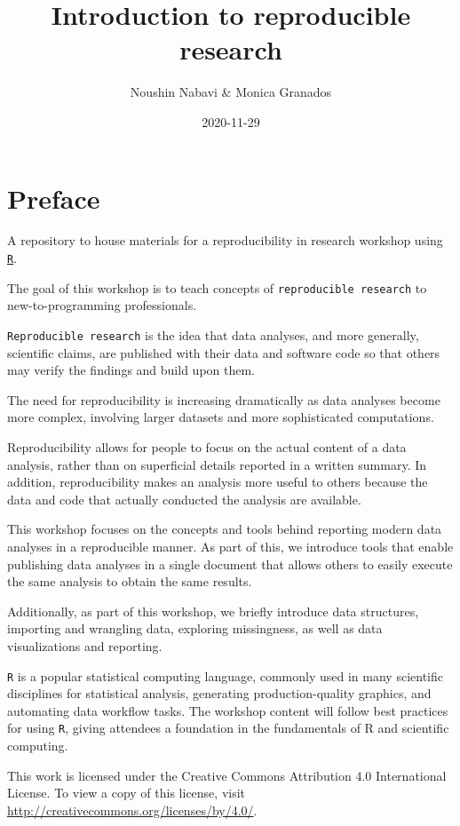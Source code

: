 \documentclass[]{book}
\title{Introduction to reproducible research}
\author{Noushin Nabavi \& Monica Granados}
\date{2020-11-29}
\begin{document}
\maketitle

{
\setcounter{tocdepth}{1}
\tableofcontents
}
\hypertarget{preface}{%
\chapter{Preface}\label{preface}}

A repository to house materials for a reproducibility in research workshop using \href{https://www.r-project.org/}{\texttt{R}}.

The goal of this workshop is to teach concepts of \texttt{reproducible\ research} to new-to-programming professionals.

\texttt{Reproducible\ research} is the idea that data analyses, and more generally, scientific claims, are published with their data and software code so that others may verify the findings and build upon them.

The need for reproducibility is increasing dramatically as data analyses become more complex, involving larger datasets and more sophisticated computations.

Reproducibility allows for people to focus on the actual content of a data analysis, rather than on superficial details reported in a written summary. In addition, reproducibility makes an analysis more useful to others because the data and code that actually conducted the analysis are available.

This workshop focuses on the concepts and tools behind reporting modern data analyses in a reproducible manner. As part of this, we introduce tools that enable publishing data analyses in a single document that allows others to easily execute the same analysis to obtain the same results.

Additionally, as part of this workshop, we briefly introduce data structures, importing and wrangling data, exploring missingness, as well as data visualizations and reporting.

\texttt{R} is a popular statistical computing language, commonly used in many scientific disciplines for statistical analysis, generating production-quality graphics, and automating data workflow tasks. The workshop content will follow best practices for using \texttt{R}, giving attendees a foundation in the fundamentals of R and scientific computing.

This work is licensed under the Creative Commons Attribution 4.0 International License.
To view a copy of this license, visit \url{http://creativecommons.org/licenses/by/4.0/}.
\end{document}
